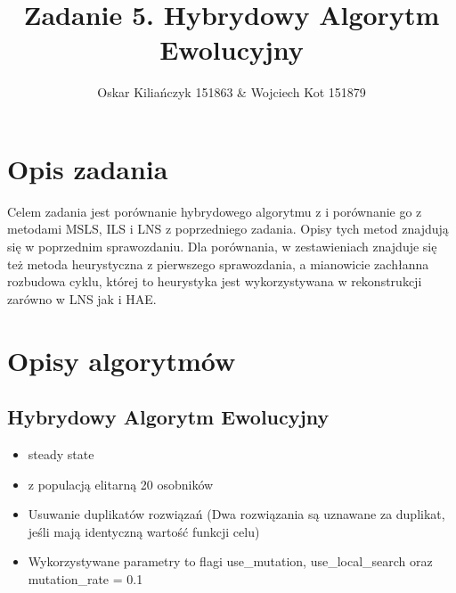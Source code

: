 \documentclass[11pt]{article}
\title{Zadanie 5. Hybrydowy Algorytm Ewolucyjny}
\author{Oskar Kiliańczyk 151863 \& Wojciech Kot 151879}
\date{}
\begin{document}
\maketitle
\newpage

\section{Opis zadania}\label{sec:opis-zadania}

Celem zadania jest porównanie hybrydowego algorytmu z  i porównanie go z metodami
MSLS, ILS i LNS z poprzedniego zadania.
Opisy tych metod znajdują się w poprzednim sprawozdaniu.
Dla porównania, w zestawieniach znajduje się też metoda heurystyczna z pierwszego sprawozdania, a mianowicie zachłanna rozbudowa cyklu,
której to heurystyka jest wykorzystywana w rekonstrukcji zarówno w LNS jak i HAE.

\section{Opisy algorytmów}\label{sec:opisy-alg}

\subsection{Hybrydowy Algorytm Ewolucyjny}\label{subsec:hybrydowy-algorytm-ewolucyjny}
\begin{itemize}
    \item steady state
    \item z populacją elitarną 20 osobników
    \item Usuwanie duplikatów rozwiązań (Dwa rozwiązania są uznawane za duplikat, jeśli mają identyczną wartość funkcji celu)
    \item Wykorzystywane parametry to flagi use\_mutation, use\_local\_search oraz mutation\_rate = 0.1
\end{itemize}
\end{document}
